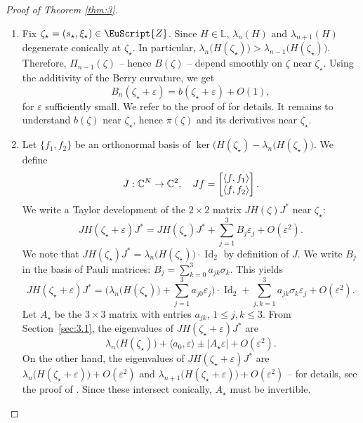 \documentclass[JEP,XML,SOM,Unicode,NoFloatCountersInSection]{cedram}
\let\pazocal\EuScript
\theoremstyle{definition}
\DeclareMathOperator{\Id}{Id}
\newcommand{\ZZZ}{{\pazocal{Z}}}
\newcommand{\C}{\mathbb{C}}
\newcommand{\Ll}{\mathbb{L}}
\let\epsi\varepsilon
\newcommand{\matrice}[1]{\arraycolsep3.5pt\begin{bmatrix}#1\end{bmatrix}}
\newcommand{\lr}[1]{\langle #1 \rangle}
\begin{document}
\begin{proof}[Proof of Theorem \ref{thm:3}]
\begin{enumerate}
\item
Fix $\zeta_\star = (s_\star,\xi_\star) \in \ZZZ$. Since $H \in \Ll$, $\lambda_n(H)$ and $\lambda_{n+1}(H)$ degenerate conically at $\zeta_\star$. In particular, $\lambda_n\bigl(H(\zeta_\star)\bigr) > \lambda_{n-1}\bigl(H(\zeta_\star)\bigr)$. Therefore, $\Pi_{n-1}(\zeta)$ -- hence $B(\zeta)$ -- depend smoothly on $\zeta$ near $\zeta_\star$.
Using the additivity of the Berry curvature, we get
\begin{equation}\label{eq:0l}
B_n(\zeta_\star+\epsi) = b(\zeta_\star+\epsi) + O(1),
\end{equation}
for $\epsi$ sufficiently small. We refer to the proof of \cite[(2.21)]{D19b} for details. It remains to understand $b(\zeta)$ near $\zeta_\star$, hence $\pi(\zeta)$ and its derivatives near $\zeta_\star$.

\item
Let $\{f_1,f_2\}$ be an orthonormal basis of $\ker\bigl( H(\zeta_\star)-\lambda_n\bigl( H(\zeta_\star) \bigr)$. We define
\begin{equation*}
J : \C^N \to \C^2, \quad Jf = \matrice{\lr{f,f_1} \\ \lr{f,f_2}}.
\end{equation*}
We write a Taylor development of the $2 \times 2$ matrix $J H(\zeta) J^*$ near $\zeta_\star$:
\[
J H(\zeta_\star+\epsi) J^* = J H(\zeta_\star) J^* + \sum_{j=1}^3 B_j \epsi_j + O(\epsi^2).
\]
We note that $J H(\zeta_\star) J^* = \lambda_n\bigl( H(\zeta_\star) \bigr) \cdot \Id_2$ by definition of $J$.
We write $B_j$ in the basis of Pauli matrices: $B_j = \sum_{k=0}^3 a_{jk} \sigma_k$. This yields
\begin{equation}\label{eq:0i}
J H(\zeta_\star+\epsi) J^* = \biggl( \lambda_n\bigl( H(\zeta_\star) \bigr) + \sum_{j=1}^3 a_{j0} \epsi_j \biggr) \cdot \Id_2 + \sum_{j, k=1}^3 a_{jk} \sigma_k \epsi_j + O(\epsi^2).
\end{equation}
Let $A_\star$ be the $3 \times 3$ matrix with entries $a_{jk}$, $1 \leq j,k \leq 3$. From Section~\ref{sec:3.1}, the eigenvalues of $J H(\zeta_\star+\epsi) J^*$ are
\begin{equation}\label{eq:0r}
\lambda_n\bigl( H(\zeta_\star) \bigr) + \lr{a_0,\epsi} \pm |A_\star\epsi| + O(\epsi^2).
\end{equation}
On the other hand, the eigenvalues of $J H(\zeta_\star+\epsi) J^*$ are $\lambda_n\bigl(H(\zeta_\star+\epsi)\bigr) + O(\epsi^2)$ and $\lambda_{n+1}\bigl( H(\zeta_\star+\epsi)\bigr) + O(\epsi^2)$ -- for details, see the proof of \cite[(2.19)]{D19b}. Since these intersect conically, $A_\star$ must be invertible.


\end{enumerate}
\end{proof}
\end{document}
